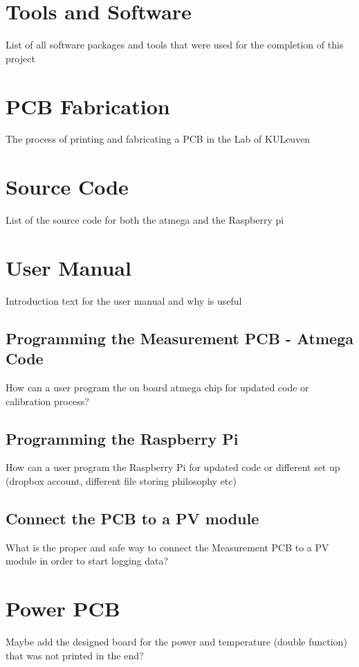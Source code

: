 \section{Tools and Software}
List of all software packages and tools that were used for the completion of this project

\section{PCB Fabrication}
The process of printing and fabricating a PCB in the Lab of KULeuven

\section{Source Code}
List of the source code for both the atmega and the Raspberry pi

\section{User Manual}
Introduction text for the user manual and why is useful

\subsection{Programming the Measurement PCB - Atmega Code}
How can a user program the on board atmega chip for updated code or calibration process?

\subsection{Programming the Raspberry Pi}
How can a user program the Raspberry Pi for updated code or different set up (dropbox account, different file storing philosophy etc)

\subsection{Connect the PCB to a PV module}
What is the proper and safe way to connect the Measurement PCB to a PV module in order to start logging data?

\section{Power PCB}
Maybe add the designed board for the power and temperature (double function) that was not printed in the end?